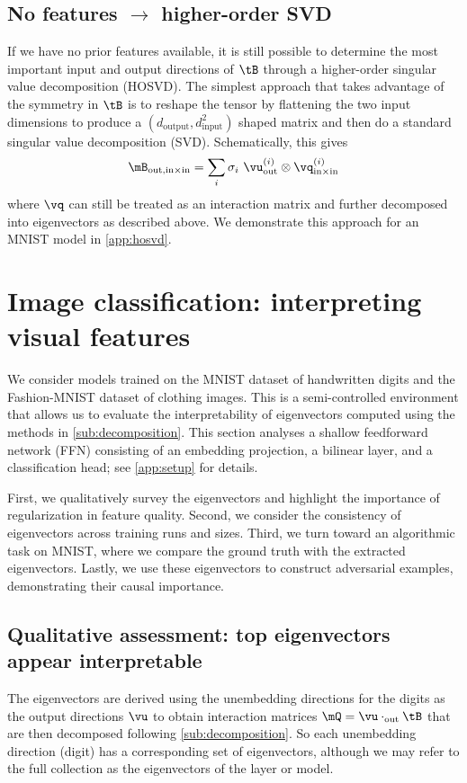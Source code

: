 \documentclass{article} %
\begin{document}
\subsection{No features $\rightarrow$ higher-order SVD}  \label{sub:hosvd}

If we have no prior features available, it is still possible to determine the most important input and output directions of $\tB$ through a higher-order singular value decomposition (HOSVD). The simplest approach that takes advantage of the symmetry in $\tB$ is to reshape the tensor by flattening the two input dimensions to produce a $(d_\text{output}, d_\text{input}^2)$ shaped matrix and then do a standard singular value decomposition (SVD). 
Schematically, this gives 
\begin{align}
    \mB_{\text{out},  \text{in}\times\text{in}} = \sum_i \sigma_i \ \vu^{(i)}_{\text{out}} \otimes \vq^{(i)}_{\text{in}\times\text{in}} \nonumber
\end{align} where $\vq$ can still be treated as an interaction matrix and further decomposed into eigenvectors as described above. We demonstrate this approach for an MNIST model in \autoref{app:hosvd}.

\section{Image classification: interpreting visual features} \label{sec:image_classfication}
We consider models trained on the MNIST dataset of handwritten digits and the Fashion-MNIST dataset of clothing images. This is a semi-controlled environment that allows us to evaluate the interpretability of eigenvectors computed using the methods in \autoref{sub:decomposition}. This section analyses a shallow feedforward network (FFN) consisting of an embedding projection, a bilinear layer, and a classification head; see \autoref{app:setup} for details.

First, we qualitatively survey the eigenvectors and highlight the importance of regularization in feature quality. Second, we consider the consistency of eigenvectors across training runs and sizes. Third, we turn toward an algorithmic task on MNIST, where we compare the ground truth with the extracted eigenvectors. Lastly, we use these eigenvectors to construct adversarial examples, demonstrating their causal importance.

\subsection{Qualitative assessment: top eigenvectors appear interpretable} \label{sub:mnist_qualitative}
The eigenvectors are derived using the unembedding directions for the digits as the output directions $\vu$ to obtain interaction matrices $\mQ = \vu \cdot_\text{out} \tB$ that are then decomposed following \autoref{sub:decomposition}. So each unembedding direction (digit) has a corresponding set of eigenvectors, although we may refer to the full collection as the eigenvectors of the layer or model. 
\end{document}
